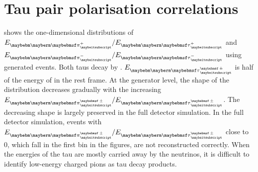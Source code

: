 \section{Tau pair polarisation correlations}
\label{sec:TauMiniCorr}

 shows the one-dimensional distributions of $E_{\Ppiplus} / E_{\APtauon}$ and $E_{\Ppiminus} / E_{\Ptauon}$ using generated \eeZZQQ events. Both taus decay by \tauToPionBoth. $E_{\Ptaupm}$ is half of the energy of \ZForTauTau in the \ZForTauTau rest frame.  At the generator level, the shape of the distribution decreases gradually with the increasing $E_{\Ppipm}/E_{\Ptaupm}$. The decreasing shape is largely preserved in the full detector simulation. In the full detector simulation, events with  $E_{\Ppipm}/E_{\Ptaupm}$ close to 0, which fall in the first bin in the figures, are not reconstructed correctly. When the energies of the tau are mostly carried away by the neutrinos, it is difficult to identify low-energy charged pions as tau decay products.



